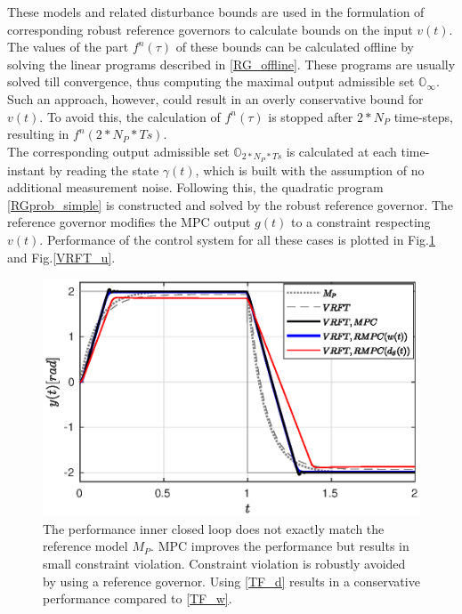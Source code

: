 \documentclass[letterpaper, 10 pt, conference]{ieeeconf}  %
\begin{document}
	These models and related disturbance bounds are used in the formulation of corresponding robust reference governors to calculate bounds on the input $v(t)$. The values of the part $f^n(\tau)$ of these bounds can be calculated offline by solving the linear programs described in \eqref{RG_offline}. These programs are usually solved till convergence, thus computing the maximal output admissible set $\mathbb{O}_{\infty}$. Such an approach, however, could result in an overly conservative bound for $v(t)$. To avoid this, the calculation of $f^n(\tau)$ is stopped after $2*N_P$ time-steps, resulting in $f^n(2*N_P*Ts)$.\\
	The corresponding output admissible set $\mathbb{O}_{2*N_P*Ts}$ is calculated at each time-instant by reading the state $\gamma(t)$, which is built with the assumption of no additional measurement noise.
	Following this,
	the quadratic program \eqref{RGprob_simple} is constructed and solved by the robust reference governor. The reference governor modifies the MPC output $g(t)$ to a constraint respecting $v(t)$. 
	Performance of the control system for all these cases is plotted in Fig.\ref{VRFT_y} and Fig.\ref{VRFT_u}.
	\begin{figure}[t]
		\hspace{-5pt}
		\includegraphics[scale = 0.60]{VRFT_vs_MPC.eps}
		\caption{The performance inner closed loop does not exactly match the reference model $M_P$. MPC improves the performance but results in small constraint violation. Constraint violation is robustly avoided by using a reference governor. Using \eqref{TF_d} results in a conservative performance compared to \eqref{TF_w}.  }
		\label{VRFT_y}
	\end{figure} 
	
\end{document}
